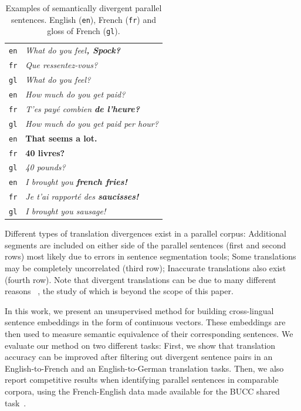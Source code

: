 \documentclass[11pt,a4paper]{article}
\begin{document}
\begin{table}[ht]
\small
\center
\begin{tabular}{ c|l }
  \hline  
  \texttt{en} & \it{What do you feel}\bf{, Spock}\it{?} \\
  \texttt{fr} & \it{Que ressentez-vous?} \\
  \texttt{gl} & {\small \it{What do you feel?}} \\
  \hline
  \texttt{en} & \it{How much do you get paid?} \\
  \texttt{fr} & \it{T'es pay\'e combien} \bf{de l'heure}\it{?} \\
  \texttt{gl} & {\small \it{How much do you get paid per hour?}} \\
  \hline  
  \texttt{en} &  \bf{That seems a lot.} \\
  \texttt{fr} & \bf{40 livres?} \\
  \texttt{gl} & {\small \it{40 pounds?}} \\
  \hline  
  \texttt{en} & \it{I brought you} \bf{french fries}\it{!} \\
  \texttt{fr} & \it{Je t'ai rapport\'e des} \bf{saucisses}\it{!} \\
  \texttt{gl} & {\small \it{I brought you sausage!}} \\
  \hline
\end{tabular}
\caption[Table caption text]{Examples of semantically divergent parallel sentences. English (\texttt{en}), French (\texttt{fr}) and gloss of French (\texttt{gl}).}
\label{tab:examples}
\end{table}

Different types of translation divergences exist in a parallel corpus:
Additional segments are included on either side of the parallel sentences (first and second rows) most likely due to errors in sentence segmentation tools;
Some translations may be completely uncorrelated (third row);
Inaccurate translations also exist (fourth row). 
Note that divergent translations can be due to many different reasons ~\cite{C14-1055}, the study of which is beyond the scope of this paper. 

In this work, we present an unsupervised method for building cross-lingual sentence embeddings in the form of continuous vectors. 
These embeddings are then used to measure semantic equivalence of their corresponding sentences.
We evaluate our method on two different tasks:
First, we show that translation accuracy can be improved after filtering out divergent sentence pairs in an English-to-French and an English-to-German translation tasks.
Then, we also report competitive results when identifying parallel sentences in comparable corpora, using the French-English data made available for the BUCC shared task~\cite{ZWEIGENBAUM18.12}.
\end{document}
